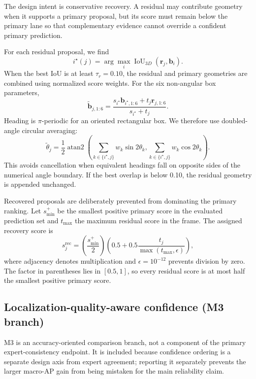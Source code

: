 \documentclass[sensors,article,submit,pdftex,moreauthors]{Definitions/mdpi}
\begin{document}
The design intent is conservative recovery. A residual may contribute geometry
when it supports a primary proposal, but its score must remain below the
primary lane so that complementary evidence cannot override a confident
primary prediction.

For each residual proposal, we find
\begin{equation}
i^\star(j)=\arg\max_i
\operatorname{IoU}_{3D}(\mathbf{r}_j,\mathbf{b}_i).
\end{equation}
When the best IoU is at least $\tau_r=0.10$, the residual and primary
geometries are combined using normalized score weights. For the six
non-angular box parameters,
\begin{equation}
\widetilde{\mathbf{b}}_{j,1:6} =
\frac{s_{i^\star}\mathbf{b}_{i^\star,1:6}
+ t_j\mathbf{r}_{j,1:6}}
{s_{i^\star}+t_j}.
\end{equation}
Heading is $\pi$-periodic for an oriented rectangular box. We therefore use
doubled-angle circular averaging:
\begin{equation}
\widetilde{\theta}_j=\frac{1}{2}\operatorname{atan2}
\left(
\sum_{k\in\{i^\star,j\}}w_k\sin 2\theta_k,
\sum_{k\in\{i^\star,j\}}w_k\cos 2\theta_k
\right).
\end{equation}
This avoids cancellation when equivalent headings fall on opposite sides of
the numerical angle boundary. If the best overlap is below 0.10, the residual
geometry is appended unchanged.

Recovered proposals are deliberately prevented from dominating the primary
ranking. Let $s_{\min}^{+}$ be the smallest positive primary score in the
evaluated prediction set and $t_{\max}$ the maximum residual score in the
frame. The assigned recovery score is
\begin{equation}
s_j^{\mathrm{rec}} =
\left(\frac{s_{\min}^{+}}{2}\right)
\left(0.5+0.5\frac{t_j}{\max(t_{\max},\epsilon)}\right),
\label{eq:recovery-score}
\end{equation}
where adjacency denotes multiplication and $\epsilon=10^{-12}$ prevents
division by zero. The factor in parentheses lies in $[0.5,1]$, so every
residual score is at most half the smallest positive primary score.

\subsection{Localization-quality-aware confidence (M3 branch)}

M3 is an accuracy-oriented comparison branch, not a component of the primary
expert-consistency endpoint. It is included because confidence ordering is a
separate design axis from expert agreement; reporting it separately prevents
the larger macro-AP gain from being mistaken for the main reliability claim.
\end{document}
